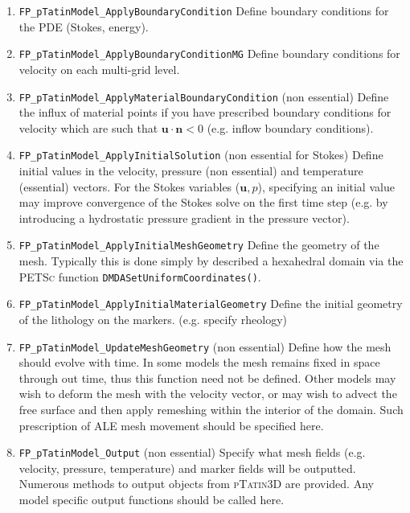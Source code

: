 \documentclass[paper=a4, fontsize=10pt,twoside]{scrartcl}
\newcommand{\ptat}{{{\textsc{pTatin3D}}}}
\newcommand{\PETSc}{{{\textsc{PETSc}}}}
\newcommand{\unix}[1]{\texttt{\footnotesize #1}}
\begin{document}
{{\begin{enumerate}
	\item \unix{FP\_pTatinModel\_ApplyBoundaryCondition}
	Define boundary conditions for the PDE (Stokes, energy).

	\item \unix{FP\_pTatinModel\_ApplyBoundaryConditionMG}
	Define boundary conditions for velocity on each multi-grid level.

	\item \unix{FP\_pTatinModel\_ApplyMaterialBoundaryCondition} (non essential)
	Define the influx of material points if you have prescribed boundary conditions for velocity which are such that $\boldsymbol u \cdot \boldsymbol n < 0$ (e.g. inflow boundary conditions).

	\item \unix{FP\_pTatinModel\_ApplyInitialSolution} (non essential for Stokes)
	Define initial values in the velocity, pressure (non essential) and temperature (essential) vectors. For the Stokes variables ($\boldsymbol u,p$), specifying an initial value may improve convergence of the Stokes solve on the first time step (e.g. by introducing a hydrostatic pressure gradient in the pressure vector).
	
	\item \unix{FP\_pTatinModel\_ApplyInitialMeshGeometry}
	Define the geometry of the mesh. Typically this is done simply by described a hexahedral domain via the {\PETSc} function \unix{DMDASetUniformCoordinates()}.

	\item \unix{FP\_pTatinModel\_ApplyInitialMaterialGeometry}
	Define the initial geometry of the lithology on the markers. (e.g. specify rheology)

	\item \unix{FP\_pTatinModel\_UpdateMeshGeometry} (non essential)
	Define how the mesh should evolve with time. In some models the mesh remains fixed in space through out time, thus this function need not be defined. Other models may wish to deform the mesh with the velocity vector, or may wish to advect the free surface and then apply remeshing within the interior of the domain. Such prescription of ALE mesh movement should be specified here.

	\item \unix{FP\_pTatinModel\_Output} (non essential)
	Specify what mesh fields (e.g. velocity, pressure, temperature) and marker fields will be outputted. Numerous
	methods to output objects from {\ptat} are provided. Any model specific output functions should be called here.


\end{enumerate}}}
\end{document}
